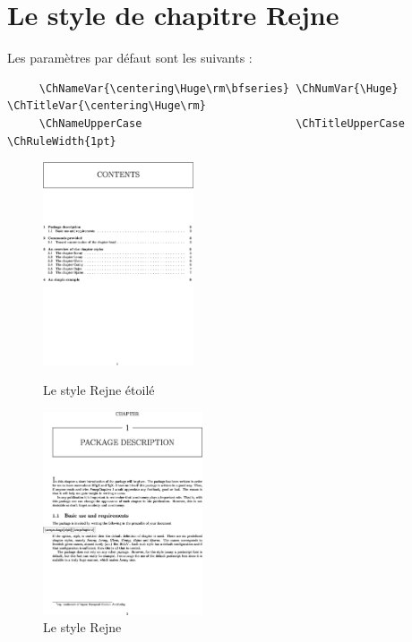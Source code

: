 \documentclass{report}
\begin{document}
    \section{Le style de chapitre Rejne}
    Les paramètres par défaut sont les suivants :
    {\small\begin{verbatim}  
     \ChNameVar{\centering\Huge\rm\bfseries} \ChNumVar{\Huge}  \ChTitleVar{\centering\Huge\rm}
     \ChNameUpperCase                        \ChTitleUpperCase \ChRuleWidth{1pt}
    \end{verbatim}}
    \begin{figure}[h]
      \begin{minipage}{7 cm}
        \centerline{\includegraphics[height=6cm]{Rejnes.eps}}
        \caption{Le style Rejne \og étoilé \fg{}}
      \end{minipage}\hfill
      \begin{minipage}{7 cm}
        \centerline{\includegraphics[height=6cm]{Rejne.eps}}
        \caption{Le style Rejne}
      \end{minipage}\hfill
    \end{figure}
\end{document}
